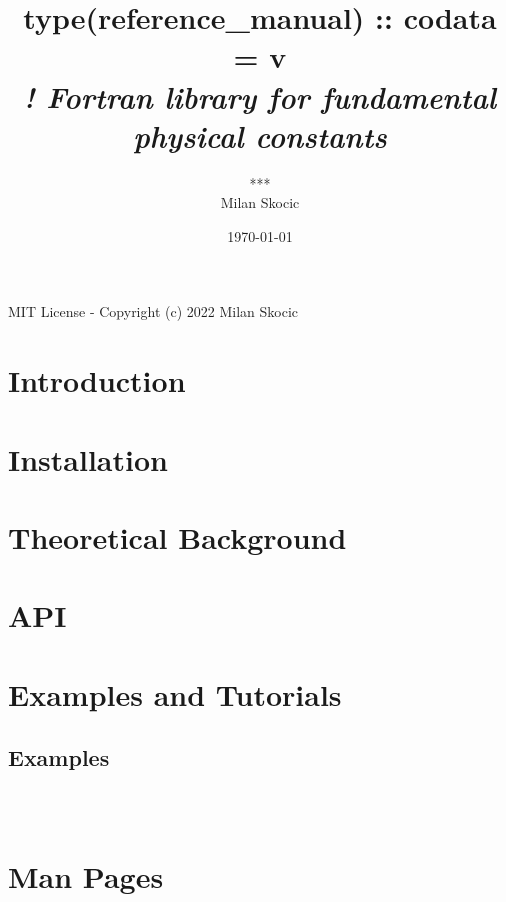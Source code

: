 \documentclass[11pt,a4paper,twoside,openright]{book}
\title{
\vspace{1cm}
{\sc \huge type(reference\_manual) :: codata = v\FPMVERSION} \\ 
\vspace{0.25cm}
{\it \normalsize ! Fortran library for fundamental physical constants }\\
}
\author{*** \\ Milan Skocic}
\date{\today }
\begin{document}
\maketitle
{\hspace{1cm} \par
\vfill 
\hfill MIT License - Copyright (c) 2022 Milan Skocic \hfill}
\frontmatter 
\pagestyle{plain}
\tableofcontents
\listoffigures
\listoftables





\mainmatter
\pagestyle{fancy}
\part{Introduction}
\part{Installation}
\part{Theoretical Background}
\part{API}
\part{Examples and Tutorials}
\chapter{Examples}
\inputminted{Fortran}{../../../example/example.f90}
\inputminted{c}{../../../example/example.c}
\inputminted{python}{../../../example/example.py}
\part{Man Pages}
\end{document}
